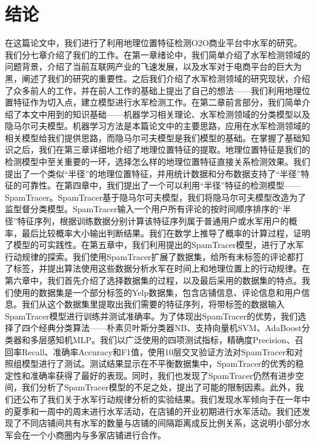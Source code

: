 
\chapter{结论}
\label{chap:concl}


在这篇论文中，我们进行了利用地理位置特征检测O2O商业平台中水军的研究。我们分七章介绍了我们的工作。在第一章绪论中，我们简单介绍了水军检测领域的问题背景，介绍了当前互联网产业的飞速发展，以及水军对于电商平台的巨大为黑，阐述了我们的研究的重要性。之后我们介绍了水军检测领域的研究现状，介绍了众多前人的工作，并在前人工作的基础上提出了自己的想法——我们利用地理位置特征作为切入点，建立模型进行水军检测工作。在第二章前言部分，我们简单介绍了本文中用到的知识基础——机器学习相关理论、水军检测领域的分类模型以及隐马尔可夫模型。机器学习方法是本篇论文中的主要思路，应用在水军检测领域的相关模型给我们提供思路，而隐马尔可夫模型是我们模型的基础。在掌握了基础知识之后，我们在第三章详细地介绍了地理位置特征的提取。地理位置特征是我们的检测模型中至关重要的一环，选择怎么样的地理位置特征直接关系检测效果。我们提出了一个类似“半径”的地理位置特征，并用统计数据和分布数据支持了“半径”特征的可靠性。在第四章中，我们提出了一个可以利用“半径”特征的检测模型——SpamTracer。SpamTracer基于隐马尔可夫模型，我们将隐马尔可夫模型改造为了监型督分类模型。SpamTracer输入一个用户所有评论的按时间顺序排序的“半径”特征序列，根据训练数据分别计算该特征序列属于普通用户或水军用户的概率，最后比较概率大小输出判断结果。我们在数学上推导了概率的计算过程，证明了模型的可实践性。在第五章中，我们利用提出的SpamTracer模型，进行了水军行动规律的探索。我们使用SpamTracer扩展了数据集，给所有未标签的评论都打了标签，并提出算法使用这些数据分析水军在时间上和地理位置上的行动规律。在第六章中，我们首先介绍了选择数据集的过程，以及最后采用的数据集的特点。我们使用的数据集是一个部分标签的Yelp数据集，包含店铺信息、评论信息和用户信息。我们从这个数据集里提取出我们需要的特征序列，将带标签的数据输入SpamTracer模型进行训练并测试准确率。为了体现出SpamTracer的优势，我们选择了四个经典分类算法——朴素贝叶斯分类器NB、支持向量机SVM、AdaBoost分类器和多层感知机MLP。我们以广泛使用的四项测试指标，精确度Precision、召回率Recall、准确率Accuracy和F1值，使用10层交叉验证方法对SpamTracer和对照组模型进行了测试。测试结果显示在不平衡数据集中，SpamTracer的优秀的稳定性和准确率获得了最好的表现。同时，我们也发现了SpamTracer仍然有进步空间，我们分析了SpamTracer模型的不足之处，提出了可能的限制因素。此外，我们还公布了我们关于水军行动规律分析的实验结果。我们发现水军倾向于在一年中的夏季和一周中的周末进行水军活动，在店铺的开业初期进行水军活动。我们还发现了不同店铺间共有水军的数量与店铺的间隔距离成反比例关系，这说明小部分水军会在一个小商圈内与多家店铺进行合作。
